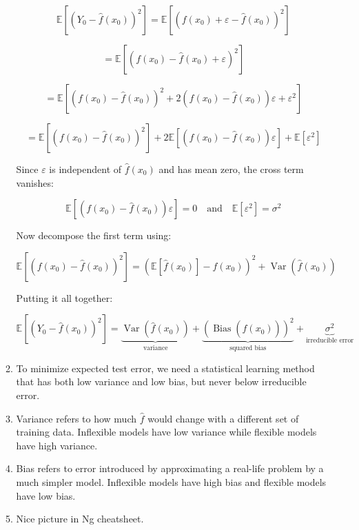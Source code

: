 \documentclass{article}
\begin{document}
\begin{enumerate}
\begin{enumerate}
\[
\mathbb{E}\left[(Y_0 - \hat{f}(x_0))^2\right]
= \mathbb{E}\left[(f(x_0) + \varepsilon - \hat{f}(x_0))^2\right]
\]

\[
= \mathbb{E}\left[(f(x_0) - \hat{f}(x_0) + \varepsilon)^2\right]
\]

\[
= \mathbb{E}\left[(f(x_0) - \hat{f}(x_0))^2 + 2(f(x_0) - \hat{f}(x_0))\varepsilon + \varepsilon^2\right]
\]

\[
= \mathbb{E}\left[(f(x_0) - \hat{f}(x_0))^2\right] + 
2 \mathbb{E}\left[(f(x_0) - \hat{f}(x_0))\varepsilon\right] + 
\mathbb{E}\left[\varepsilon^2\right]
\]

Since \( \varepsilon \) is independent of \( \hat{f}(x_0) \) and has mean zero, the cross term vanishes:

\[
\mathbb{E}\left[(f(x_0) - \hat{f}(x_0))\varepsilon\right] = 0
\quad \text{and} \quad
\mathbb{E}\left[\varepsilon^2\right] = \sigma^2
\]

Now decompose the first term using:

\[
\mathbb{E}\left[(f(x_0) - \hat{f}(x_0))^2\right] =
\left( \mathbb{E}[\hat{f}(x_0)] - f(x_0) \right)^2 +
\operatorname{Var}(\hat{f}(x_0))
\]

Putting it all together:

\[
\mathbb{E}\left[(Y_0 - \hat{f}(x_0))^2\right] =
\underbrace{\operatorname{Var}(\hat{f}(x_0))}_{\text{variance}} +
\underbrace{\left( \operatorname{Bias}(\hat{f}(x_0)) \right)^2}_{\text{squared bias}} +
\underbrace{\sigma^2}_{\text{irreducible error}}
\]

\item To minimize expected test error, we need a statistical learning method that has both low variance and low bias, but 
never below irreducible error.
\item Variance refers to how much $\hat{f}$ would change with a different set of training data. Inflexible models have low variance while flexible models have high variance.
\item Bias refers to error introduced by approximating a real-life problem by a much simpler model. Inflexible models have high bias and flexible models have low bias.
\item Nice picture in Ng cheatsheet.
\end{enumerate}


\end{enumerate}
\end{document}
